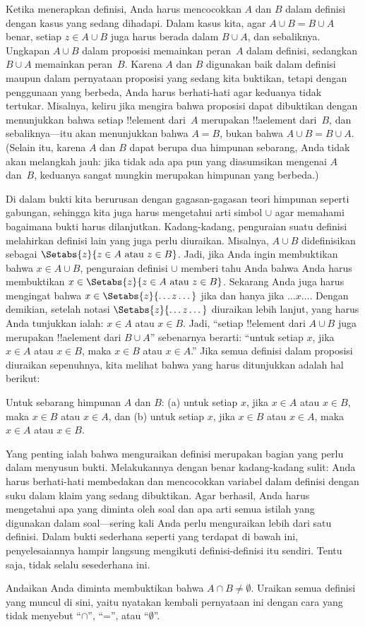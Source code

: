 \documentclass[../../../include/open-logic-section]{subfiles}
\begin{document}
Ketika menerapkan definisi, Anda harus mencocokkan $A$ dan $B$ dalam
definisi dengan kasus yang sedang dihadapi. Dalam kasus kita, agar $A
\cup B = B \cup A$ benar, setiap $z \in A \cup B$ juga harus berada
dalam $B \cup A$, dan sebaliknya. Ungkapan $A \cup B$ dalam proposisi
memainkan peran~$A$ dalam definisi, sedangkan $B \cup A$ memainkan
peran~$B$. Karena $A$ dan $B$ digunakan baik dalam definisi maupun
dalam pernyataan proposisi yang sedang kita buktikan, tetapi dengan
penggunaan yang berbeda, Anda harus berhati-hati agar keduanya tidak
tertukar. Misalnya, keliru jika mengira bahwa proposisi dapat
dibuktikan dengan menunjukkan bahwa setiap !!{element} dari~$A$
merupakan !!a{element} dari~$B$, dan sebaliknya---itu akan menunjukkan
bahwa $A = B$, bukan bahwa $A \cup B = B \cup A$. (Selain itu, karena
$A$ dan $B$ dapat berupa dua himpunan sebarang, Anda tidak akan
melangkah jauh: jika tidak ada apa pun yang diasumsikan mengenai $A$
dan~$B$, keduanya sangat mungkin merupakan himpunan yang berbeda.)

Di dalam bukti kita berurusan dengan gagasan-gagasan teori himpunan
seperti gabungan, sehingga kita juga harus mengetahui arti simbol
$\cup$ agar memahami bagaimana bukti harus dilanjutkan. Kadang-kadang,
penguraian suatu definisi melahirkan definisi lain yang juga perlu
diuraikan. Misalnya, $A \cup B$ didefinisikan sebagai
$\Setabs{z}{z \in A \text{ atau } z \in B}$. Jadi, jika Anda ingin
membuktikan bahwa $x \in A \cup B$, penguraian definisi $\cup$
memberi tahu Anda bahwa Anda harus membuktikan $x \in
\Setabs{z}{z \in A \text{ atau } z \in B}$. Sekarang Anda juga harus
mengingat bahwa $x \in \Setabs{z}{\dots z\dots}$ jika dan hanya jika
$\dots x\dots$. Dengan demikian, setelah notasi
$\Setabs{z}{\dots z \dots}$ diuraikan lebih lanjut, yang harus Anda
tunjukkan ialah: $x \in A$ atau $x \in B$. Jadi, ``setiap !!{element}
dari $A \cup B$ juga merupakan !!a{element} dari $B \cup A$''
sebenarnya berarti: ``untuk setiap $x$, jika $x \in A$ atau $x \in B$,
maka $x \in B$ atau $x \in A$.'' Jika semua definisi dalam proposisi
diuraikan sepenuhnya, kita melihat bahwa yang harus ditunjukkan adalah
hal berikut:

\begin{prop}
Untuk sebarang himpunan $A$ dan $B$: (a) untuk setiap $x$, jika $x \in
A$ atau $x \in B$, maka $x \in B$ atau $x \in A$, dan (b) untuk setiap
$x$, jika $x \in B$ atau $x \in A$, maka $x \in A$ atau $x \in B$.
\end{prop}

Yang penting ialah bahwa menguraikan definisi merupakan bagian yang
perlu dalam menyusun bukti. Melakukannya dengan benar kadang-kadang
sulit: Anda harus berhati-hati membedakan dan mencocokkan variabel
dalam definisi dengan suku dalam klaim yang sedang dibuktikan. Agar
berhasil, Anda harus mengetahui apa yang diminta oleh soal dan apa
arti semua istilah yang digunakan dalam soal---sering kali Anda perlu
menguraikan lebih dari satu definisi. Dalam bukti sederhana seperti
yang terdapat di bawah ini, penyelesaiannya hampir langsung mengikuti
definisi-definisi itu sendiri. Tentu saja, tidak selalu sesederhana
ini.

\begin{prob}
Andaikan Anda diminta membuktikan bahwa $A \cap B \neq \emptyset$.
Uraikan semua definisi yang muncul di sini, yaitu nyatakan kembali
pernyataan ini dengan cara yang tidak menyebut ``$\cap$'', ``='', atau
``$\emptyset$''.
\end{prob}
\end{document}
